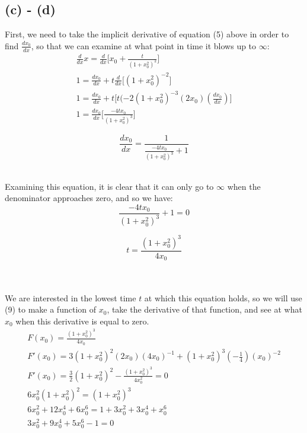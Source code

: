 \documentclass{article}
\begin{document}
\subsection*{(c) - (d)}
First, we need to take the implicit derivative of equation (5) above in order to find $\frac{dx_0}{dx}$, so that we can examine at what point in time it blows up to $\infty$:
\begin{equation}
\begin{aligned}
\frac{d}{dx}x = \frac{d}{dx} \Big[x_0 + \frac{t}{(1+x_0^2)^2}\Big]\\
1 = \frac{dx_0}{dx} + t\frac{d}{dx}\Big[(1+x_0^2)^{-2}\Big]\\
1 = \frac{dx_0}{dx} + t\Big[t(-2(1 + x_0^2)^{-3}(2x_0)(\frac{dx_0}{dx})\Big]\\
1 = \frac{dx_0}{dx}\Big[\frac{-4tx_0}{(1+x_0^2)^3}\Big]
\end{aligned}
\end{equation}
\begin{tcolorbox}[minipage,colback=white,arc=0pt,outer arc=0pt]
\begin{equation}
\frac{dx_0}{dx} = \frac{1}{\frac{-4tx_0}{(1+x_0^2)^3} + 1}
\end{equation}
\end{tcolorbox}~\\
Examining this equation, it is clear that it can only go to $\infty$ when the denominator approaches zero, and so we have:
\begin{equation}
\frac{-4tx_0}{(1+x_0^2)^3} + 1 = 0
\end{equation}
\begin{tcolorbox}[minipage,colback=white,arc=0pt,outer arc=0pt]
\begin{equation}
t = \frac{(1+x_0^2)^3}{4x_0}
\end{equation}
\end{tcolorbox}~\\
\\
We are interested in the lowest time $t$ at which this equation holds, so we will use (9) to make a function of $x_0$, take the derivative of that function, and see at what $x_0$ when this derivative is equal to zero.
\begin{equation}
\begin{aligned}
F(x_0) = \frac{(1+x_0^2)^3}{4x_0}\\
F'(x_0) = 3(1+x_0^2)^2(2x_0)(4x_0)^{-1} + (1+x_0^2)^3(-\frac{1}{4})(x_0)^{-2}\\
F'(x_0) = \frac{3}{2}(1+x_0^2)^2 - \frac{(1+x_0^2)^3}{4x_0^2} = 0\\
6x_0^2(1+x_0^2)^2 = (1+x_0^2)^3\\
6x_0^2 + 12x_0^4 +6x_0^6 = 1 + 3x_0^2 + 3x_0^4 +x_0^6\\
3x_0^2 + 9x_0^4 + 5x_0^6 -1 = 0
\end{aligned}
\end{equation}
\end{document}
